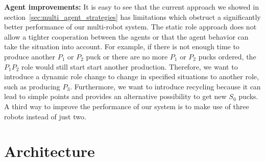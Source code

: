 \textbf{Agent improvements:} It is easy to see that the current approach we showed in section~\ref{sec:multi_agent_strategies} has limitations which obstruct a significantly better performance of our multi-robot system. The static role approach does not allow a tighter cooperation between the agents or that the agent behavior can take the situation into account. For example, if there is not enough time to produce another $P_1$ or $P_2$ puck or there are no more $P_1$ or $P_2$ pucks ordered, the $P_1P_2$ role would still start start another production. Therefore, we want to introduce a dynamic role change to change in specified situations to another role, such as producing $P_3$. Furthermore, we want to introduce recycling because it can lead to simple points and provides an alternative possibility to get new $S_0$ pucks. A third way to improve the performance of our system is to make use of three robots instead of just two.\\



\section{Architecture}
\label{sec:architecture}

